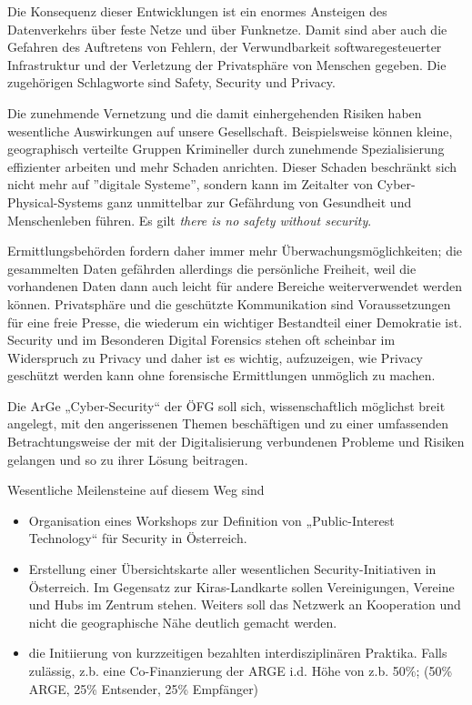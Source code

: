 \documentclass[11pt]{scrartcl}
\begin{document}
Die Konsequenz dieser Entwicklungen ist ein enormes Ansteigen des Datenverkehrs über feste Netze und über Funknetze. Damit sind aber auch die Gefahren des Auftretens von Fehlern, der Verwundbarkeit softwaregesteuerter Infrastruktur und der Verletzung der Privatsphäre von Menschen gegeben. Die zugehörigen Schlagworte sind Safety, Security und Privacy.

Die zunehmende Vernetzung und die damit einhergehenden Risiken haben wesentliche Auswirkungen auf unsere Gesellschaft. Beispielsweise können kleine, geographisch verteilte Gruppen Krimineller durch zunehmende Spezialisierung effizienter arbeiten und mehr Schaden anrichten. Dieser Schaden beschränkt sich nicht mehr auf ''digitale Systeme'', sondern kann im Zeitalter von Cyber-Physical-Systems ganz unmittelbar zur Gefährdung von Gesundheit und Menschenleben führen. Es gilt \emph{there is no safety without security}.

Ermittlungsbehörden fordern daher immer mehr Überwachungsmöglichkeiten; die gesammelten Daten gefährden allerdings die persönliche Freiheit, weil die vorhandenen Daten dann auch leicht für andere Bereiche weiterverwendet werden können. Privatsphäre und die geschützte Kommunikation sind Voraussetzungen für eine freie Presse, die wiederum ein wichtiger Bestandteil einer Demokratie ist. Security und im Besonderen Digital Forensics stehen oft scheinbar im Widerspruch zu Privacy und daher ist es wichtig, aufzuzeigen, wie Privacy geschützt werden kann ohne forensische Ermittlungen unmöglich zu machen.

Die ArGe „Cyber-Security“ der ÖFG soll sich, wissenschaftlich möglichst breit angelegt, mit den angerissenen Themen beschäftigen und zu einer umfassenden Betrachtungsweise der mit der Digitalisierung verbundenen Probleme und Risiken gelangen und so zu ihrer Lösung beitragen.

Wesentliche Meilensteine auf diesem Weg sind
\begin{itemize}
    \item Organisation eines Workshops zur Definition von „Public-Interest Technology“  für Security in Österreich.
    \item Erstellung einer Übersichtskarte aller wesentlichen Security-Initiativen in Österreich. Im Gegensatz zur Kiras-Landkarte  sollen Vereinigungen, Vereine und Hubs im Zentrum stehen. Weiters soll das Netzwerk an Kooperation und nicht die geographische Nähe deutlich gemacht werden.
    \item die Initiierung von kurzzeitigen bezahlten interdisziplinären Praktika. Falls zulässig, z.b. eine Co-Finanzierung der ARGE i.d. Höhe von z.b. 50\%; (50\% ARGE, 25\% Entsender, 25\% Empfänger)
\end{itemize}
\end{document}
